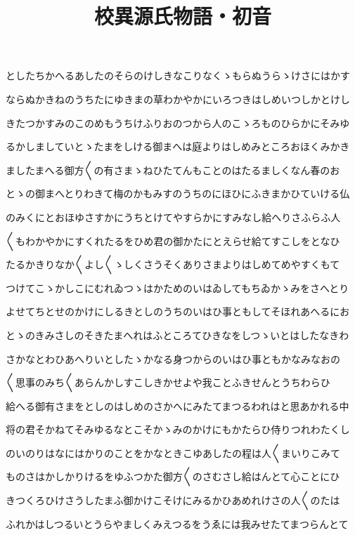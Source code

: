 \documentclass[a4paper,11pt,landscape]{ltjtarticle}
\title{校異源氏物語・初音}
\date{}
\begin{document}
\maketitle

としたちかへるあしたのそらのけしきなこりなくゝもらぬうらゝけさにはかす
\par\medskip
ならぬかきねのうちたにゆきまの草わかやかにいろつきはしめいつしかとけし
\par\medskip
きたつかすみのこのめもうちけふりおのつから人のこゝろものひらかにそみゆ
\par\medskip
るかしましていとゝたまをしける御まへは庭よりはしめみところおほくみかき
\par\medskip
ましたまへる御方〱の有さまゝねひたてんもことのはたるましくなん春のお
\par\medskip
とゝの御まへとりわきて梅のかもみすのうちのにほひにふきまかひていける仏
\par\medskip
のみくにとおほゆさすかにうちとけてやすらかにすみなし給へりさふらふ人
\par\medskip
〱もわかやかにすくれたるをひめ君の御かたにとえらせ給てすこしをとなひ
\par\medskip
たるかきりなか〱よし〱ゝしくさうそくありさまよりはしめてめやすくもて
\par\medskip
つけてこゝかしこにむれゐつゝはかためのいはゐしてもちゐかゝみをさへとり
\par\medskip
よせてちとせのかけにしるきとしのうちのいはひ事ともしてそほれあへるにお
\par\medskip
とゝのきみさしのそきたまへれはふところてひきなをしつゝいとはしたなきわ
\par\medskip
さかなとわひあへりいとしたゝかなる身つからのいはひ事ともかなみなおの
\par\medskip
〱思事のみち〱あらんかしすこしきかせよや我ことふきせんとうちわらひ
\par\medskip
給へる御有さまをとしのはしめのさかへにみたてまつるわれはと思あかれる中
\par\medskip
将の君そかねてそみゆるなとこそかゝみのかけにもかたらひ侍りつれわたくし
\par\medskip
のいのりはなにはかりのことをかなときこゆあしたの程は人〱まいりこみて
\par\medskip
ものさはかしかりけるをゆふつかた御方〱のさむさし給はんとて心ことにひ
\par\medskip
きつくろひけさうしたまふ御かけこそけにみるかひあめれけさの人〱のたは
\par\medskip
ふれかはしつるいとうらやましくみえつるをうゑには我みせたてまつらんとて
\end{document}
